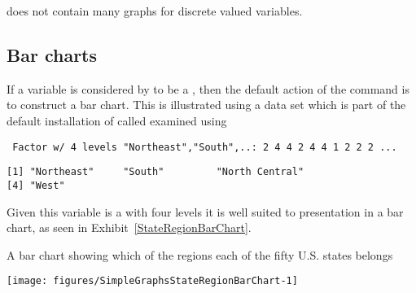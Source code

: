 \R{} does not contain many graphs for discrete valued variables. 
 
\subsection{Bar charts} 
\label{BarCharts} 
 
If a variable is considered by \R{} to be a , then the default action of the  command is to construct a bar chart. This is illustrated using a data set which is part of the default installation of \R{} called  examined using 
\begin{knitrout}
\color{fgcolor}\begin{kframe}
\begin{alltt}
\hlstd{> }
\end{alltt}
\begin{verbatim}
 Factor w/ 4 levels "Northeast","South",..: 2 4 4 2 4 4 1 2 2 2 ...
\end{verbatim}
\begin{alltt}
\hlstd{> }
\end{alltt}
\begin{verbatim}
[1] "Northeast"     "South"         "North Central"
[4] "West"         
\end{verbatim}
\end{kframe}
\end{knitrout}
Given this variable is a  with four levels it is well suited to presentation in a bar chart, as seen in Exhibit~\ref{StateRegionBarChart}. 
 
\begin{exhibit} 
\begin{center} 
\caption{A bar chart showing which of the regions each of the fifty U.S. states belongs} 
\label{StateRegionBarChart} 
\begin{knitrout}
\color{fgcolor}\begin{kframe}
\begin{alltt}
\hlstd{> }
\end{alltt}
\end{kframe}
\texttt{[image: figures/SimpleGraphsStateRegionBarChart-1]} 

\end{knitrout}
\end{center} 
\end{exhibit} 
 
